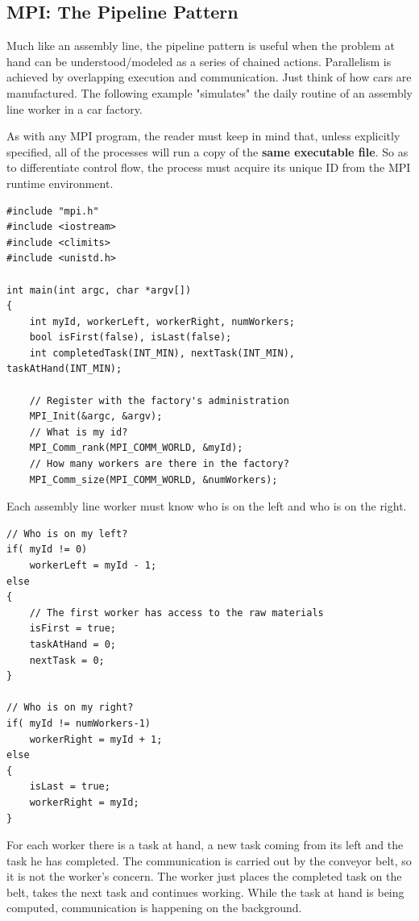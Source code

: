 \documentclass[11pt]{article}
\begin{document}
\subsection{MPI: The Pipeline Pattern}
\label{AppendixD}

Much like an assembly line, 
the pipeline pattern is useful when the problem at hand can be understood/modeled as a series of chained actions.
Parallelism is achieved by overlapping execution and communication.
Just think of how cars are manufactured.
The following example "simulates" the daily routine of an assembly line worker in a car factory.

As with any MPI program, the reader must keep in mind that, unless explicitly specified, all of the processes will run a copy of the \textbf{same executable file}.
So as to differentiate control flow, the process must acquire its unique ID from the MPI runtime environment.
\begin{verbatim}
#include "mpi.h"
#include <iostream>
#include <climits>
#include <unistd.h> 

int main(int argc, char *argv[])
{
    int myId, workerLeft, workerRight, numWorkers;
    bool isFirst(false), isLast(false);
    int completedTask(INT_MIN), nextTask(INT_MIN), taskAtHand(INT_MIN);

    // Register with the factory's administration
    MPI_Init(&argc, &argv);
    // What is my id?
    MPI_Comm_rank(MPI_COMM_WORLD, &myId);
    // How many workers are there in the factory?
    MPI_Comm_size(MPI_COMM_WORLD, &numWorkers);
\end{verbatim}

Each assembly line worker must know who is on the left and who is on the right.
\begin{verbatim}
// Who is on my left?
if( myId != 0)
    workerLeft = myId - 1;
else
{
    // The first worker has access to the raw materials
    isFirst = true;
    taskAtHand = 0;
    nextTask = 0;
}

// Who is on my right?
if( myId != numWorkers-1)
    workerRight = myId + 1;
else
{
    isLast = true;
    workerRight = myId;	
}
\end{verbatim}


For each worker there is a task at hand, a new task coming from its left and the task he has completed.
The communication is carried out by the conveyor belt, so it is not the worker's concern.
The worker just places the completed task on the belt, takes the next task and continues working.
While the task at hand is being computed, communication is happening on the background.
\end{document}
